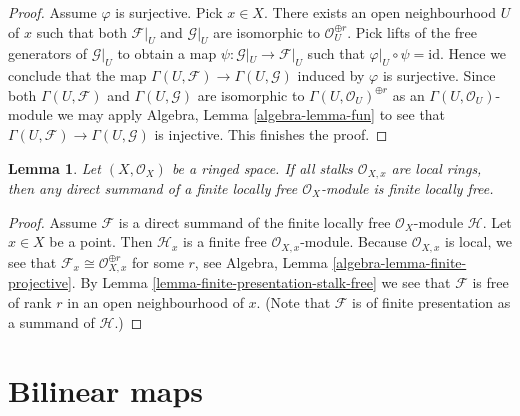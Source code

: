 \documentclass{stacks-project}
\theoremstyle{plain}
\newtheorem{lemma}[subsection]{Lemma}
\theoremstyle{definition}
\theoremstyle{remark}
\numberwithin{equation}{subsection}
\begin{document}
\begin{proof}
Assume $\varphi$ is surjective. Pick $x \in X$.
There exists an open neighbourhood $U$ of $x$
such that both $\mathcal{F}|_U$ and $\mathcal{G}|_U$ are
isomorphic to $\mathcal{O}_U^{\oplus r}$.
Pick lifts of the free generators of $\mathcal{G}|_U$
to obtain a map $\psi : \mathcal{G}|_U \to \mathcal{F}|_U$
such that $\varphi|_U \circ \psi = \text{id}$.
Hence we conclude that the map
$\Gamma(U, \mathcal{F}) \to \Gamma(U, \mathcal{G})$
induced by $\varphi$ is surjective. Since both
$\Gamma(U, \mathcal{F})$ and $\Gamma(U, \mathcal{G})$
are isomorphic to $\Gamma(U, \mathcal{O}_U)^{\oplus r}$
as an $\Gamma(U, \mathcal{O}_U)$-module we may
apply Algebra, Lemma \ref{algebra-lemma-fun} to see that
$\Gamma(U, \mathcal{F}) \to \Gamma(U, \mathcal{G})$
is injective. This finishes the proof.
\end{proof}

\begin{lemma}
\label{lemma-direct-summand-of-locally-free-is-locally-free}
Let $(X, \mathcal{O}_X)$ be a ringed space. If all stalks $\mathcal{O}_{X, x}$
are local rings, then any direct summand of a finite locally free
$\mathcal{O}_X$-module is finite locally free.
\end{lemma}

\begin{proof}
Assume $\mathcal{F}$ is a direct summand of the finite locally free
$\mathcal{O}_X$-module $\mathcal{H}$.
Let $x \in X$ be a point. Then $\mathcal{H}_x$ is a finite free
$\mathcal{O}_{X, x}$-module.
Because $\mathcal{O}_{X, x}$ is local, we see that
$\mathcal{F}_x \cong \mathcal{O}_{X, x}^{\oplus r}$ for some $r$, see
Algebra, Lemma \ref{algebra-lemma-finite-projective}.
By Lemma \ref{lemma-finite-presentation-stalk-free}
we see that $\mathcal{F}$ is free of rank $r$ in an open neighbourhood of $x$.
(Note that $\mathcal{F}$ is of finite presentation as a summand of
$\mathcal{H}$.)
\end{proof}





\section{Bilinear maps}
\label{section-bilinear}
\end{document}
